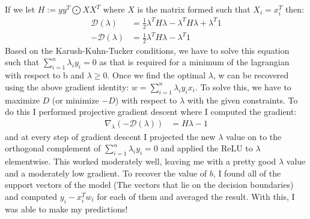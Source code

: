 \documentclass[12pt]{article}
\begin{document}
If we let $H := yy^T \bigodot XX^T$ where $X$ is the matrix formed such that $X_i = x_i^T$ then:
\begin{align*}
    \mathcal{D}(\lambda) &= \frac{1}{2}\lambda^T H \lambda - \lambda^T H \lambda + \lambda^T 1 \\
    - \mathcal{D}(\lambda) &= \frac{1}{2}\lambda^T H \lambda - \lambda^T 1 
\end{align*}
Based on the Karush-Kuhn-Tucker conditions, we have to solve this equation such that
$\displaystyle \sum_{i=1}^{n} \lambda_iy_i = 0$ as that is required for a minimum of the lagrangian with respect to b
and $\lambda \geq 0$. Once we find the optimal $\lambda$, w can be recovered using the above gradient identity:
$w = \displaystyle \sum_{i=1}^{n} \lambda_iy_ix_i$. To solve this, we have to maximize $D$ (or minimize $-D$)
with respect to $\lambda$ with the given constraints. To do this I performed projective gradient descent
where I computed the gradient:
\begin{align*}
    \nabla_\lambda(- \mathcal{D}(\lambda)) &= H\lambda - 1
\end{align*}
and at every step of gradient descent I projected the new $\lambda$ value on to the orthogonal complement of
$\displaystyle \sum_{i=1}^{n} \lambda_iy_i = 0$ and applied the ReLU to $\lambda$ elementwise. This worked moderately well,
leaving me with a pretty good $\lambda$ value and a moderately low gradient. To recover the value of $b$,
I found all of the support vectors of the model (The vectors that lie on the decision boundaries) and computed $y_i - x_i^Tw_i$
for each of them and averaged the result. With this, I was able to make my predictions!
\end{document}
